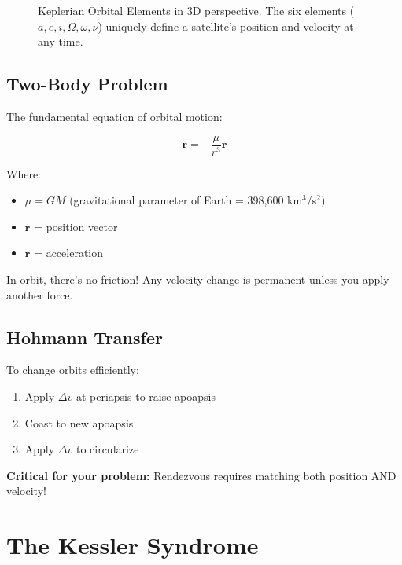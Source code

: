 \documentclass[11pt,a4paper]{article}
\begin{document}
\begin{figure}[htbp]
\caption{Keplerian Orbital Elements in 3D perspective. The six elements ($a, e, i, \Omega, \omega, \nu$) uniquely define a satellite's position and velocity at any time.}
\label{fig:keplerian}
\end{figure}

\subsection{Two-Body Problem}

The fundamental equation of orbital motion:

\begin{equation}
\ddot{\mathbf{r}} = -\frac{\mu}{r^3} \mathbf{r}
\end{equation}

Where:
\begin{itemize}[leftmargin=*]
    \item $\mu = GM$ (gravitational parameter of Earth = 398,600 km$^3$/s$^2$)
    \item $\mathbf{r}$ = position vector
    \item $\ddot{\mathbf{r}}$ = acceleration
\end{itemize}

\begin{tcolorbox}[colback=yellow!10!white,colframe=emphcolor,title=Key Insight for Controls]
In orbit, there's no friction! Any velocity change is permanent unless you apply another force.
\end{tcolorbox}

\subsection{Hohmann Transfer}

To change orbits efficiently:
\begin{enumerate}
    \item Apply $\Delta v$ at periapsis to raise apoapsis
    \item Coast to new apoapsis
    \item Apply $\Delta v$ to circularize
\end{enumerate}

\textbf{Critical for your problem:} Rendezvous requires matching both position AND velocity!

\section{The Kessler Syndrome}
\end{document}

